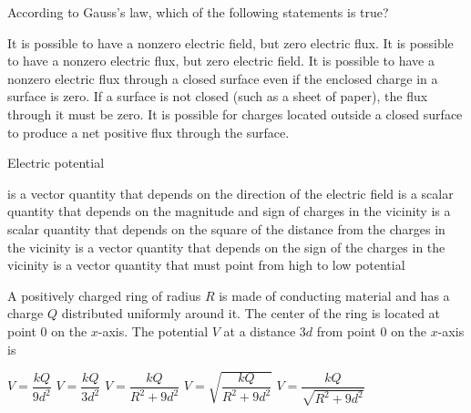 \documentclass{../../../oss-apphys-exam}
\begin{document}
\begin{multicols*}{2}
\begin{questions}
   \question According to Gauss's law, which of the following statements is
   true?
   \begin{choices}
     \choice It is possible to have a nonzero electric field, but zero electric
     flux.
     \choice It is possible to have a nonzero electric flux, but zero electric
     field.
     \choice It is possible to have a nonzero electric flux through a closed
     surface even if the enclosed charge in a surface is zero.
     \choice If a surface is not closed (such as a sheet of paper), the flux
     through it must be zero.
     \choice It is possible for charges located outside a closed surface to
     produce a net positive flux through the surface.
   \end{choices}
   
   \question Electric potential
   \begin{choices}
     \choice is a vector quantity that depends on the direction of the electric
     field
     \choice is a scalar quantity that depends on the magnitude and sign of
     charges in the vicinity
     \choice is a scalar quantity that depends on the square of the distance
     from the charges in the vicinity
     \choice is a vector quantity that depends on the sign of the charges in the
     vicinity
     \choice is a vector quantity that must point from high to low potential
   \end{choices}
   \columnbreak
   

   \question A positively charged ring of radius $R$ is made of conducting
   material and has a charge $Q$ distributed uniformly around it. The center of
   the ring is located at point $0$ on the $x$-axis. The potential $V$ at a
   distance $3d$ from point $0$ on the $x$-axis is
   \begin{center}
   \end{center}
   \begin{choices}
     \choice $V=\dfrac{kQ}{9d^2}$
     \choice $V=\dfrac{kQ}{3d^2}$
     \choice $V=\dfrac{kQ}{R^2+9d^2}$
     \choice $V=\sqrt{\dfrac{kQ}{R^2+9d^2}}$
     \choice $V=\dfrac{kQ}{\sqrt{R^2+9d^2}}$
   \end{choices}
   

\end{questions}
\end{multicols*}
\end{document}
